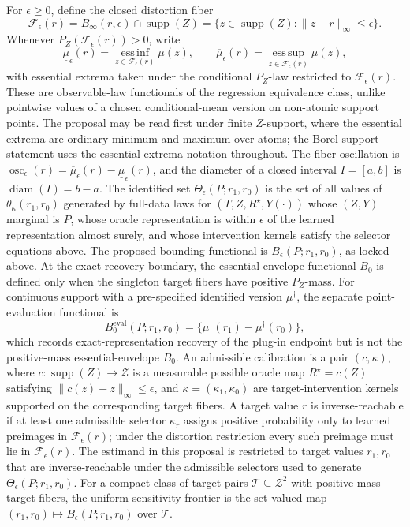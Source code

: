 \documentclass[11pt]{article}
\theoremstyle{definition}
\theoremstyle{plain}
\theoremstyle{remark}
\begin{document}
For \(\epsilon\ge0\), define the closed distortion fiber
\[
\mathcal F_\epsilon(r)=B_\infty(r,\epsilon)\cap\operatorname{supp}(Z)
=\{z\in\operatorname{supp}(Z):\|z-r\|_\infty\le\epsilon\}.
\]
Whenever \(P_Z(\mathcal F_\epsilon(r))>0\), write
\[
\underline\mu_\epsilon(r)=\operatorname*{ess\,inf}_{z\in\mathcal F_\epsilon(r)}\mu(z),
\qquad
\overline\mu_\epsilon(r)=\operatorname*{ess\,sup}_{z\in\mathcal F_\epsilon(r)}\mu(z),
\]
with essential extrema taken under the conditional \(P_Z\)-law restricted to \(\mathcal F_\epsilon(r)\).  These are observable-law functionals of the regression equivalence class, unlike pointwise values of a chosen conditional-mean version on non-atomic support points.  The proposal may be read first under finite \(Z\)-support, where the essential extrema are ordinary minimum and maximum over atoms; the Borel-support statement uses the essential-extrema notation throughout.
The fiber oscillation is \(\operatorname{osc}_\epsilon(r)=\overline\mu_\epsilon(r)-\underline\mu_\epsilon(r)\), and the diameter of a closed interval \(I=[a,b]\) is \(\operatorname{diam}(I)=b-a\).
The identified set \(\Theta_\epsilon(P;r_1,r_0)\) is the set of all values of \(\theta_\kappa(r_1,r_0)\) generated by full-data laws for \((T,Z,R^\star,Y(\cdot))\) whose \((Z,Y)\) marginal is \(P\), whose oracle representation is within \(\epsilon\) of the learned representation almost surely, and whose intervention kernels satisfy the selector equations above.  The proposed bounding functional is \(B_\epsilon(P;r_1,r_0)\), as locked above.
At the exact-recovery boundary, the essential-envelope functional \(B_0\) is defined only when the singleton target fibers have positive \(P_Z\)-mass.  For continuous support with a pre-specified identified version \(\mu^\dagger\), the separate point-evaluation functional is
\[
B^{\mathrm{eval}}_0(P;r_1,r_0)=\{\mu^\dagger(r_1)-\mu^\dagger(r_0)\},
\]
which records exact-representation recovery of the plug-in endpoint but is not the positive-mass essential-envelope \(B_0\).
An admissible calibration is a pair \((c,\kappa)\), where \(c:\operatorname{supp}(Z)\to\mathcal Z\) is a measurable possible oracle map \(R^\star=c(Z)\) satisfying \(\|c(z)-z\|_\infty\le\epsilon\), and \(\kappa=(\kappa_1,\kappa_0)\) are target-intervention kernels supported on the corresponding target fibers.  A target value \(r\) is inverse-reachable if at least one admissible selector \(\kappa_r\) assigns positive probability only to learned preimages in \(\mathcal F_\epsilon(r)\); under the distortion restriction every such preimage must lie in \(\mathcal F_\epsilon(r)\).  The estimand in this proposal is restricted to target values \(r_1,r_0\) that are inverse-reachable under the admissible selectors used to generate \(\Theta_\epsilon(P;r_1,r_0)\).  For a compact class of target pairs \(\mathcal T\subseteq\mathcal Z^2\) with positive-mass target fibers, the uniform sensitivity frontier is the set-valued map \((r_1,r_0)\mapsto B_\epsilon(P;r_1,r_0)\) over \(\mathcal T\).
\end{document}
